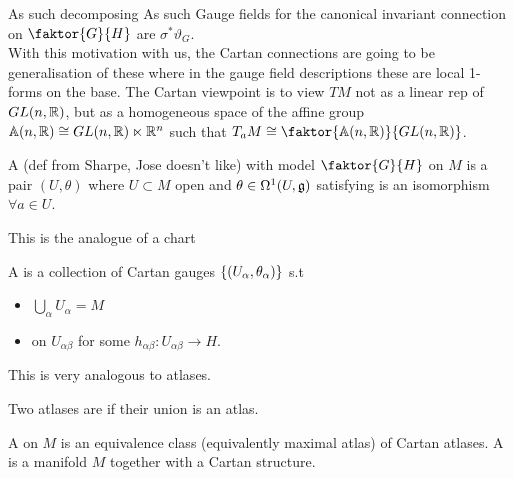 \documentclass{article}
\begin{document}
As such decomposing 
As such 
Gauge fields for the canonical invariant connection on $\faktor{G}{H}$ are $\sigma^\ast \vartheta_G$. \\
With this motivation with us, the Cartan connections are going to be generalisation of these where in the gauge field descriptions these are local 1-forms on the base. The Cartan viewpoint is to view $TM$ not as a linear rep of $GL(n,\mathbb{R})$, but as a homogeneous space of the affine group $\mathbb{A}(n,\mathbb{R})\cong GL(n,\mathbb{R}) \ltimes \mathbb{R}^n$ such that $T_a M \cong \faktor{\mbb{A}(n,\mbb{R})}{GL(n,\mbb{R})}$.

\begin{definition}
A  (def from Sharpe, Jose doesn't like) with model $\faktor{G}{H}$ on $M$ is a pair $(U,\theta)$ where $U \subset M$ open and $\theta \in \Omega^1(U,\mathfrak{g})$ satisfying 
is an isomorphism $\forall a \in U$. 
\end{definition}
This is the analogue of a chart
\begin{definition}
A  is a collection of Cartan gauges $\left\{ (U_\alpha,\theta_\alpha) \right\}$ s.t 
\begin{itemize}
    \item $\bigcup_{\alpha} U_\alpha = M $
    \item on $U_{\alpha\beta}$ 
    for some $h_{\alpha\beta}:U_{\alpha\beta} \to H$. 
\end{itemize}
\end{definition}
This is very analogous to atlases. 
\begin{definition}
Two atlases are  if their union is an atlas. 
\end{definition}

\begin{definition}
A  on $M$ is an equivalence class (equivalently maximal atlas) of Cartan atlases. A  is a manifold $M$ together with a Cartan structure.  
\end{definition}
\end{document}
